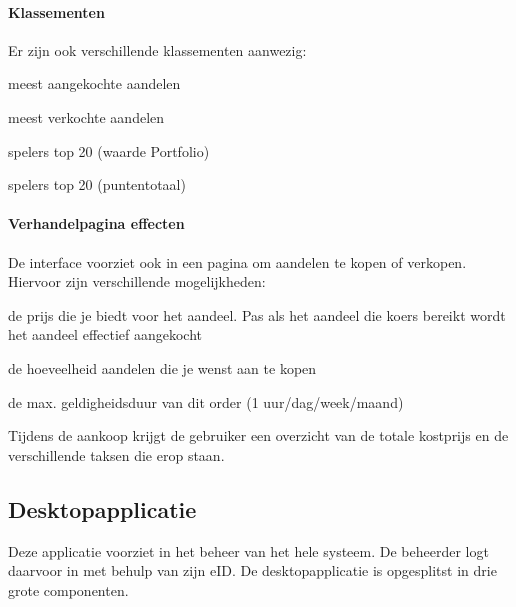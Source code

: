 \paragraph{Klassementen}Er zijn ook verschillende klassementen aanwezig:
\begin{itemize_compact}
	\item{meest aangekochte aandelen}
	\item{meest verkochte aandelen}
	\item{spelers top 20 (waarde Portfolio)}
	\item{spelers top 20 (puntentotaal)}
\end{itemize_compact}

\paragraph{Verhandelpagina effecten}De interface voorziet ook in een pagina om aandelen te kopen of verkopen. Hiervoor zijn verschillende mogelijkheden:
\begin{itemize_compact}
	\item{de prijs die je biedt voor het aandeel. Pas als het aandeel die koers bereikt wordt het aandeel effectief aangekocht}
	\item{de hoeveelheid aandelen die je wenst aan te kopen}
	\item{de max. geldigheidsduur van dit order (1 uur/dag/week/maand)}
\end{itemize_compact}
Tijdens de aankoop krijgt de gebruiker een overzicht van de totale kostprijs en de verschillende taksen die erop staan.

\subsection{Desktopapplicatie}
Deze applicatie voorziet in het beheer van het hele systeem. De beheerder logt daarvoor in met behulp van zijn eID.
De desktopapplicatie is opgesplitst in drie grote componenten.


